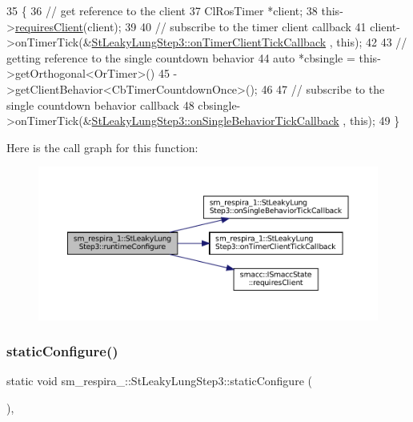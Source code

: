 \begin{DoxyCode}
35     \{
36         \textcolor{comment}{// get reference to the client}
37         ClRosTimer *client;
38         this->\hyperlink{classsmacc_1_1ISmaccState_a7f95c9f0a6ea2d6f18d1aec0519de4ac}{requiresClient}(client);
39 
40         \textcolor{comment}{// subscribe to the timer client callback}
41         client->onTimerTick(&\hyperlink{structsm__respira__1_1_1StLeakyLungStep3_aba1b3c5760856cfc92389b526650a189}{StLeakyLungStep3::onTimerClientTickCallback}
      , \textcolor{keyword}{this});
42 
43         \textcolor{comment}{// getting reference to the single countdown behavior}
44         \textcolor{keyword}{auto} *cbsingle = this->getOrthogonal<OrTimer>()
45                              ->getClientBehavior<CbTimerCountdownOnce>();
46 
47         \textcolor{comment}{// subscribe to the single countdown behavior callback}
48         cbsingle->onTimerTick(&\hyperlink{structsm__respira__1_1_1StLeakyLungStep3_a2d8634bd1a528c486d8d5f4454bbfef5}{StLeakyLungStep3::onSingleBehaviorTickCallback}
      , \textcolor{keyword}{this});
49     \}
\end{DoxyCode}
Here is the call graph for this function\+:
\nopagebreak
\begin{figure}[H]
\begin{center}
\leavevmode
\includegraphics[width=350pt]{structsm__respira__1_1_1StLeakyLungStep3_abea67094aaff8b69c96f478914165c8f_cgraph}
\end{center}
\end{figure}
\mbox{\label{structsm__respira__1_1_1StLeakyLungStep3_a43d0e0d80ec8436ff14252691ab19a83}} 
\subsubsection{\texorpdfstring{static\+Configure()}{staticConfigure()}}
{\footnotesize\ttfamily static void sm\+\_\+respira\+\_\+::\+St\+Leaky\+Lung\+Step3\+::static\+Configure (\begin{DoxyParamCaption}{ }\end{DoxyParamCaption})\hspace{0.3cm}{\ttfamily [inline]}, {\ttfamily [static]}}



